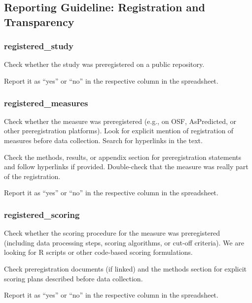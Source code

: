 {\subsection*{Reporting Guideline: Registration and Transparency}

\subsubsection*{registered\_study}
\label{reg}
Check whether the study was preregistered on a public repository. 

Report it as ``yes'' or ``no'' in the respective column in the spreadsheet.

\subsubsection*{registered\_measures}
\label{regmeasures}
Check whether the measure was preregistered (e.g., on OSF, AsPredicted, or other preregistration platforms). Look for explicit mention of registration of measures before data collection. Search for hyperlinks in the text. 

Check the methods, results, or appendix section for preregistration statements and follow hyperlinks if provided. Double-check that the measure was really part of the registration. 

Report it as ``yes'' or ``no'' in the respective column in the spreadsheet.

\subsubsection*{registered\_scoring}
\label{regscoring}
Check whether the scoring procedure for the measure was preregistered (including data processing steps, scoring algorithms, or cut-off criteria). We are looking for R scripts or other code-based scoring formulations. 

Check preregistration documents (if linked) and the methods section for explicit scoring plans described before data collection.  

Report it as ``yes'' or ``no'' in the respective column in the spreadsheet.




}
